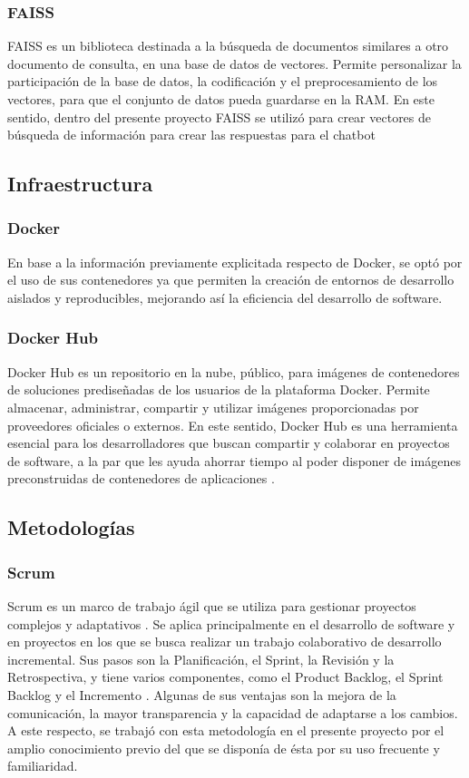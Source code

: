 \subsubsection{FAISS}
FAISS es un biblioteca destinada a la búsqueda de documentos similares a otro documento de consulta, en una base de datos de vectores. Permite personalizar la participación de la base de datos, la codificación y el preprocesamiento de los vectores, para que el conjunto de datos pueda guardarse en la RAM. En este sentido, dentro del presente proyecto FAISS se utilizó para crear vectores de búsqueda de información para crear las respuestas para el chatbot \cite{art:faiss}

\subsection{Infraestructura}

\subsubsection{Docker}
En base a la información previamente explicitada respecto de Docker, se optó por el uso de sus contenedores ya que permiten la creación de entornos de desarrollo aislados y reproducibles, mejorando así la eficiencia del desarrollo de software. 

\subsubsection{Docker Hub}
Docker Hub es un repositorio en la nube, público, para imágenes de contenedores de soluciones prediseñadas de los usuarios de la plataforma Docker. Permite almacenar, administrar, compartir y utilizar imágenes proporcionadas por proveedores oficiales o externos. En este sentido, Docker Hub es una herramienta esencial para los desarrolladores que buscan compartir y colaborar en proyectos de software, a la par que les ayuda ahorrar tiempo al poder disponer de imágenes preconstruidas de contenedores de aplicaciones \cite{art:docker_hub}.

\subsection{Metodologías}

\subsubsection{Scrum}
Scrum es un marco de trabajo ágil que se utiliza para gestionar proyectos complejos y adaptativos \cite{book:kniberg}. Se aplica principalmente en el desarrollo de software y en proyectos en los que se busca realizar un trabajo colaborativo de desarrollo incremental. Sus pasos son la Planificación, el Sprint, la Revisión y la Retrospectiva, y tiene varios componentes, como el Product Backlog, el Sprint Backlog y el Incremento \cite{book:scrum}. Algunas de sus ventajas son la mejora de la comunicación, la mayor transparencia y la capacidad de adaptarse a los cambios. A este respecto, se trabajó con esta metodología en el presente proyecto por el amplio conocimiento previo del que se disponía de ésta por su uso frecuente y familiaridad.

